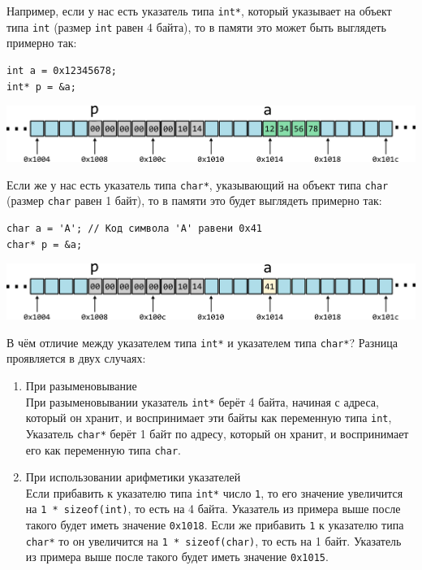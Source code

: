 \documentclass{article}
\begin{document}
Например, если у нас есть указатель типа \texttt{int*}, который указывает на объект типа \texttt{int} (размер \texttt{int} равен 4 байта), то в памяти это может быть выглядеть примерно так:
\begin{lstlisting}
int a = 0x12345678;
int* p = &a;
\end{lstlisting}

\begin{center}
\includegraphics[scale=1]{../images/memory_3_pointer_to_int_b.png}
\end{center}

Если же у нас есть указатель типа \texttt{char*}, указывающий на объект типа \texttt{char} (размер \texttt{char} равен 1 байт), то в памяти это будет выглядеть примерно так:
\begin{lstlisting}
char a = 'A'; // Код символа 'A' равени 0x41 
char* p = &a;
\end{lstlisting}

\begin{center}
\includegraphics[scale=1]{../images/memory_3_pointer_to_char_b.png}
\end{center}

\newpage
В чём отличие между указателем типа \texttt{int*} и указателем типа \texttt{char*}? Разница проявляется в двух случаях:
\begin{enumerate}
\item При разыменовывание\\
При разыменовывании указатель \texttt{int*} берёт 4 байта, начиная с адреса, который он хранит, и воспринимает эти байты как переменную типа \texttt{int}, Указатель \texttt{char*} берёт 1 байт по адресу, который он хранит, и воспринимает его как переменную типа \texttt{char}.

\item При использовании арифметики указателей\\
Если прибавить к указателю типа \texttt{int*} число \texttt{1}, то его значение увеличится на \texttt{1 * sizeof(int)}, то есть на 4 байта. Указатель из примера выше после такого будет иметь значение \texttt{0x1018}. Если же прибавить \texttt{1} к указателю типа \texttt{char*} то он увеличится на \texttt{1 * sizeof(char)}, то есть на 1 байт. Указатель из примера выше после такого будет иметь значение \texttt{0x1015}.
\end{enumerate}
\end{document}
